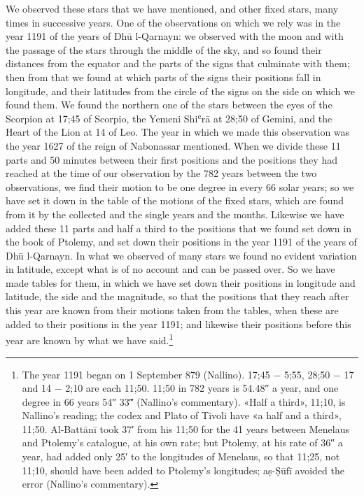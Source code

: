 \documentclass[11pt]{article}
\newcommand{\ArPage}[1]{\marginpar{\footnotesize\color{gray}Ar.\,p.\,#1}}
\begin{document}
\par \ArPage{188}We observed these stars that we have mentioned, and other fixed stars, many times in successive years. One of the observations on which we rely was in the year 1191 of the years of Dhū l-Qarnayn: we observed with the moon and with the passage of the stars through the middle of the sky, and so found their distances from the equator and the parts of the signs that culminate with them; then from that we found at which parts of the signs their positions fall in longitude, and their latitudes from the circle of the signs on the side on which we found them. We found the northern one of the stars between the eyes of the Scorpion at 17;45 of Scorpio, the Yemeni Shiʿrā at 28;50 of Gemini, and the Heart of the Lion at 14 of Leo. The year in which we made this observation was the year 1627 of the reign of Nabonassar mentioned. When we divide these 11 parts and 50 minutes between their first positions and the positions they had reached at the time of our observation by the 782 years between the two observations, we find their motion to be one degree in every 66 solar years; so we have set it down in the table of the motions of the fixed stars, which are found from it by the collected and the single years and the months. Likewise we have added these 11 parts and half a third to the positions that we found set down in the book of Ptolemy, and set down their positions in the year 1191 of the years of Dhū l-Qarnayn. In what we observed of many stars we found no evident variation in latitude, except what is of no account and can be passed over. So we have made tables for them, in which we have set down their positions in longitude and latitude, the side and the magnitude, so that the positions that they reach after this year are known from their motions taken from the tables, when these are added to their positions in the year 1191; and likewise their positions before this year are known by what we have said.\footnote{The year 1191 began on 1 September 879 (Nallino). 17;45 − 5;55, 28;50 − 17 and 14 − 2;10 are each 11;50. 11;50 in 782 years is 54.48″ a year, and one degree in 66 years 54″ 33‴ (Nallino's commentary). «Half a third», 11;10, is Nallino's reading; the codex and Plato of Tivoli have «a half and a third», 11;50. Al-Battānī took 37′ from his 11;50 for the 41 years between Menelaus and Ptolemy's catalogue, at his own rate; but Ptolemy, at his rate of 36″ a year, had added only 25′ to the longitudes of Menelaus, so that 11;25, not 11;10, should have been added to Ptolemy's longitudes; aṣ-Ṣūfī avoided the error (Nallino's commentary).}\par
\end{document}
